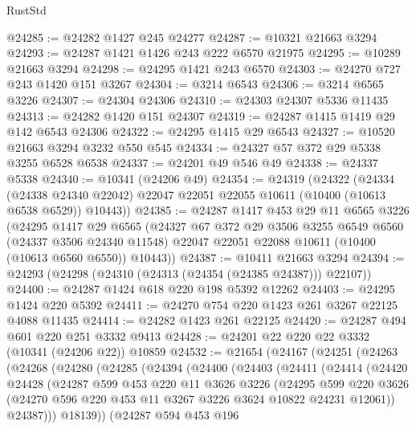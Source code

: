 \begin{lexlean}{RustStd}
\begin{coremodule}
{\begin{coremodule}
{{{{{{{{{{{{{{{{{{{{{{{{{@24285 := @24282 @1427 @245 @24277
@24287 := @10321 @21663 @3294
@24293 := @24287 @1421 @1426 @243 @222 @6570 @21975
@24295 := @10289 @21663 @3294
@24298 := @24295 @1421 @243 @6570
@24303 := @24270 @727 @243 @1420 @151 @3267
@24304 := @3214 @6543
@24306 := @3214 @6565 @3226
@24307 := @24304 @24306
@24310 := @24303 @24307 @5336 @11435
@24313 := @24282 @1420 @151 @24307
@24319 := @24287 @1415 @1419 @29 @142 @6543 @24306
@24322 := @24295 @1415 @29 @6543
@24327 := @10520 @21663 @3294 @3232 @550 @545
@24334 := @24327 @57 @372 @29 @5338 @3255 @6528 @6538
@24337 := @24201 @49 @546 @49
@24338 := @24337 @5338
@24340 := @10341 (@24206 @49)
@24354 := @24319
    (@24322
      (@24334
        (@24338 @24340 @22042)
        @22047
        @22051
        @22055
        @10611
        (@10400 (@10613 @6538 @6529))
        @10443))
@24385 := @24287
    @1417
    @453
    @29
    @11
    @6565
    @3226
    (@24295
      @1417
      @29
      @6565
      (@24327
        @67
        @372
        @29
        @3506
        @3255
        @6549
        @6560
        (@24337 @3506 @24340 @11548)
        @22047
        @22051
        @22088
        @10611
        (@10400 (@10613 @6560 @6550))
        @10443))
@24387 := @10411 @21663 @3294
@24394 := @24293 (@24298 (@24310 (@24313 (@24354 (@24385 @24387))) @22107))
@24400 := @24287 @1424 @618 @220 @198 @5392 @12262
@24403 := @24295 @1424 @220 @5392
@24411 := @24270 @754 @220 @1423 @261 @3267 @22125 @4088 @11435
@24414 := @24282 @1423 @261 @22125
@24420 := @24287 @494 @601 @220 @251 @3332 @9413
@24428 := @24201 @22 @220 @22 @3332 (@10341 (@24206 @22)) @10859
@24532 := @21654
    (@24167
      (@24251
        (@24263
          (@24268
            (@24280
              (@24285
                (@24394
                  (@24400
                    (@24403
                      (@24411
                        (@24414
                          (@24420
                            @24428
                            (@24287
                              @599
                              @453
                              @220
                              @11
                              @3626
                              @3226
                              (@24295
                                @599
                                @220
                                @3626
                                (@24270 @596 @220 @453 @11 @3267 @3226 @3624 @10822 @24231 @12061))
                              @24387)))
                        @18139))
                    (@24287
                      @594
                      @453
                      @196
}}}}}}}}}}}}}}}}}}}}}}}}}
\end{coremodule}}
\end{coremodule}
\end{lexlean}
